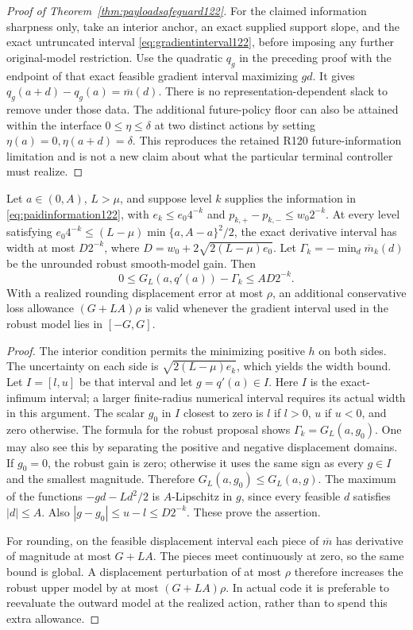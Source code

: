 \begin{proof}[Proof of Theorem~\ref{thm:payloadsafeguard122}]
For the claimed information sharpness only, take an interior anchor,
an exact supplied support slope, and the exact untruncated interval
\eqref{eq:gradientinterval122}, before imposing any further original-model
restriction. Use the quadratic $q_g$ in the preceding proof with the endpoint
of that exact feasible gradient interval maximizing $gd$. It gives
$q_g(a+d)-q_g(a)=\overline m(d)$.
There is no representation-dependent slack to remove under those data.
The additional future-policy floor can also be attained within the
interface $0\le\eta\le\delta$ at two distinct actions by setting
$\eta(a)=0,\eta(a+d)=\delta$. This reproduces the retained R120
future-information limitation and is not a new claim about what the
particular terminal controller must realize.
\end{proof}

\begin{proposition}
\label{prop:precisionladder122}
Let $a\in(0,A)$, $L>\mu$, and suppose level $k$ supplies the information
in \eqref{eq:paidinformation122}, with $e_k\le e_0 4^{-k}$ and
$p_{k,+}-p_{k,-}\le w_0 2^{-k}$. At every level satisfying
$e_0 4^{-k}\le (L-\mu)\min\{a,A-a\}^2/2$, the exact derivative
interval has width at most $D2^{-k}$, where
$D=w_0+2\sqrt{2(L-\mu)e_0}$.
Let $\Gamma_k=-\min_d\overline m_k(d)$ be the unrounded robust
smooth-model gain. Then
\[
 0\le G_L(a,q'(a))-\Gamma_k\le AD2^{-k}.
\]
With a realized rounding displacement error at most $\rho$, an additional
conservative loss allowance $(G+LA)\rho$ is valid whenever the gradient
interval used in the robust model lies in $[-G,G]$.
\end{proposition}

\begin{proof}
The interior condition permits the minimizing positive $h$ on both
sides. The uncertainty on each side is
$\sqrt{2(L-\mu)e_k}$, which yields the width bound.
Let $I=[l,u]$ be that interval and let $g=q'(a)\in I$.
Here $I$ is the exact-infimum interval; a larger finite-radius numerical
interval requires its actual width in this argument. The scalar $g_0$ in
$I$ closest to zero is $l$ if $l>0$, $u$ if
$u<0$, and zero otherwise. The formula for the robust proposal shows
$\Gamma_k=G_L(a,g_0)$. One may also see this by separating the
positive and negative displacement domains.
If $g_0=0$, the robust gain is zero; otherwise it uses the same
sign as every $g\in I$ and the smallest magnitude.
Therefore $G_L(a,g_0)\le G_L(a,g)$.
The maximum of the functions $-gd-Ld^2/2$ is $A$-Lipschitz in $g$,
since every feasible $d$ satisfies $|d|\le A$.
Also $|g-g_0|\le u-l\le D2^{-k}$. These prove the assertion.

For rounding, on the feasible displacement interval each piece of
$\overline m$ has derivative of magnitude at most $G+LA$.
The pieces meet continuously at zero, so the same bound is global.
A displacement perturbation of at most $\rho$ therefore increases
the robust upper model by at most $(G+LA)\rho$.
In actual code it is preferable to reevaluate the outward model at
the realized action, rather than to spend this extra allowance.
\end{proof}

